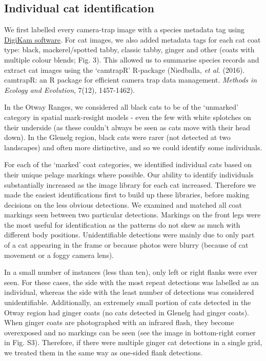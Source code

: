 \documentclass[preprint, 3p, authoryear]{elsarticle} %
\begin{document}
\newpage

\hypertarget{density-app-id}{%
\subsection{Individual cat identification}\label{density-app-id}}

We first labelled every camera-trap image with a species metadata tag using \href{https://www.digikam.org}{DigiKam software}. For cat images, we also added metadata tags for each cat coat type: black, mackerel/spotted tabby, classic tabby, ginger and other (coats with multiple colour blends; Fig. 3). This allowed us to summarise species records and extract cat images using the `camtrapR' R-package (Niedballa, \emph{et al.} (2016). camtrapR: an R package for efficient camera trap data management. \emph{Methods in Ecology and Evolution}, 7(12), 1457-1462).

In the Otway Ranges, we considered all black cats to be of the `unmarked' category in spatial mark-resight models - even the few with white splotches on their underside (as these couldn't always be seen as cats move with their head down). In the Glenelg region, black cats were rarer (not detected at two landscapes) and often more distinctive, and so we could identify some individuals.

For each of the `marked' coat categories, we identified individual cats based on their unique pelage markings where possible. Our ability to identify individuals substantially increased as the image library for each cat increased. Therefore we made the easiest identifications first to build up these libraries, before making decisions on the less obvious detections. We examined and matched all coat markings seen between two particular detections. Markings on the front legs were the most useful for identification as the patterns do not skew as much with different body positions. Unidentifiable detections were mainly due to only part of a cat appearing in the frame or because photos were blurry (because of cat movement or a foggy camera lens).

In a small number of instances (less than ten), only left or right flanks were ever seen. For these cases, the side with the most repeat detections was labelled as an individual, whereas the side with the least number of detections was considered unidentifiable. Additionally, an extremely small portion of cats detected in the Otway region had ginger coats (no cats detected in Glenelg had ginger coats). When ginger coats are photographed with an infrared flash, they become overexposed and no markings can be seen (see the image in bottom-right corner in Fig. S3). Therefore, if there were multiple ginger cat detections in a single grid, we treated them in the same way as one-sided flank detections.
\end{document}
